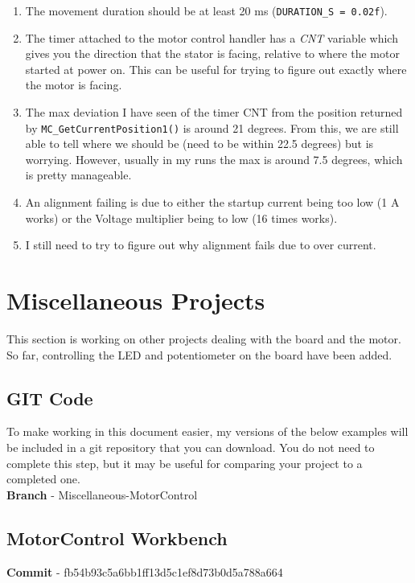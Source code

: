 \documentclass[10pt]{article}
\begin{document}
                \begin{enumerate}
                    \item The movement duration should be at least 20 ms (\texttt{DURATION\_S = 0.02f}).
                    \item The timer attached to the motor control handler has a \emph{CNT} variable which gives you the direction that the stator is facing, relative to where the motor started at power on. This can be useful for trying to figure out exactly where the motor is facing. 
                    \item The max deviation I have seen of the timer CNT from the position returned by \texttt{MC\_GetCurrentPosition1()} is around 21 degrees. From this, we are still able to tell where we should be (need to be within 22.5 degrees) but is worrying. However, usually in my runs the max is around 7.5 degrees, which is pretty manageable.
                    \item An alignment failing is due to either the startup current being too low (1 A works) or the Voltage multiplier being to low (16 times works).
                    \item I still need to try to figure out why alignment fails due to over current.
                \end{enumerate}
	\FloatBarrier \section{Miscellaneous Projects}
    This section is working on other projects dealing with the board and the motor. So far, controlling the LED and potentiometer on the board have been added.
		\FloatBarrier \subsection{GIT Code}
            To make working in this document easier, my versions of the below examples will be included in a git repository that you can download. You do not need to complete this step, but it may be useful for comparing your project to a completed one. \\
            \textbf{Branch} - Miscellaneous-MotorControl
		\FloatBarrier \subsection{MotorControl Workbench}
            \textbf{Commit} - fb54b93c5a6bb1ff13d5c1ef8d73b0d5a788a664 \\
\end{document}
